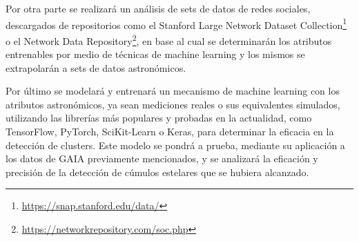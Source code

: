 \documentclass[
	11pt,oneside,a4paper
]{article}
\renewcommand\fbox{\fcolorbox{gray!50}{white}}
\begin{document}
Por otra parte se realizará un análisis de sets de datos de redes sociales, descargados de repositorios como el Stanford Large Network Dataset Collection\footnote{\url{https://snap.stanford.edu/data/}} o el Network Data Repository\footnote{\url{https://networkrepository.com/soc.php}}, en base al cual se determinarán los atributos entrenables por medio de técnicas de machine learning y los mismos se extrapolarán a sets de datos astronómicos.

Por último se modelará y entrenará un mecanismo de machine learning con los atributos astronómicos, ya sean mediciones reales o sus equivalentes simulados, utilizando las librerías más populares y probadas en la actualidad, como TensorFlow, PyTorch, SciKit-Learn o Keras, para determinar la eficacia en la detección de clusters. Este modelo se pondrá a prueba, mediante su aplicación a los datos de GAIA previamente mencionados, y se analizará la eficación y precisión de la detección de cúmulos estelares que se hubiera alcanzado.

	
	
	
		
\end{document}
